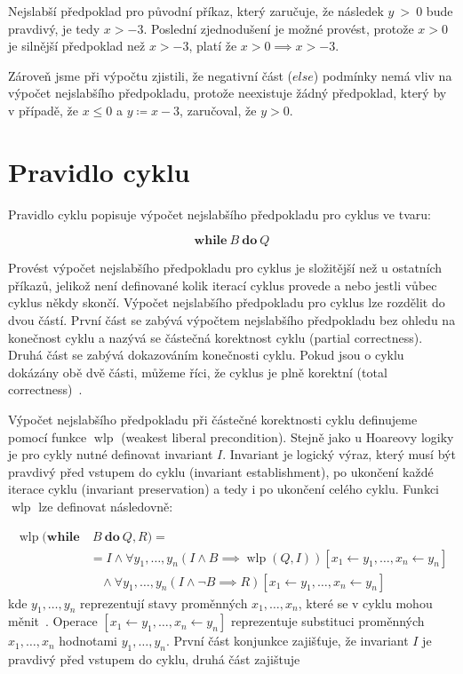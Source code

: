 Nejslabší předpoklad pro původní příkaz,
který zaručuje, že následek $y~>~0$ bude pravdivý, je tedy $x > -3$.
Poslední zjednodušení je možné provést, protože $x > 0$ je silnější předpoklad než $x > -3$,
platí že $x > 0 \implies x > -3$.

Zároveň jsme při výpočtu zjistili, že negativní část ($else$) podmínky nemá vliv na výpočet nejslabšího předpokladu,
protože neexistuje žádný předpoklad, který by v případě, že $x \leq 0$ a $y \coloneqq x - 3$, zaručoval, že $y > 0$.

\section{Pravidlo cyklu}
\label{sec:pravidlo-cyklu}

Pravidlo cyklu popisuje výpočet nejslabšího předpokladu pro cyklus ve tvaru:

\begin{equation*}
    \textbf{while} \ B \ \textbf{do} \ Q
\end{equation*}

Provést výpočet nejslabšího předpokladu pro cyklus je složitější než u ostatních příkazů,
jelikož není definované kolik iterací cyklus provede a nebo jestli vůbec cyklus někdy skončí.
Výpočet nejslabšího předpokladu pro cyklus lze rozdělit do dvou částí.
První část se zabývá výpočtem nejslabšího předpokladu bez ohledu na konečnost cyklu
a nazývá se částečná korektnost cyklu (partial correctness).
Druhá část se zabývá dokazováním konečnosti cyklu.
Pokud jsou o cyklu dokázány obě dvě části,
můžeme říci, že cyklus je plně korektní (total correctness)~\cite{arusoaie2024wp}.

Výpočet nejslabšího předpokladu při částečné korektnosti cyklu
definujeme pomocí funkce $\operatorname{wlp}$ (weakest liberal precondition).
Stejně jako u Hoareovy logiky je pro cykly nutné definovat invariant $I$.
Invariant je logický výraz, který musí být pravdivý před vstupem do cyklu (invariant establishment),
po ukončení každé iterace cyklu (invariant preservation) a tedy i po ukončení celého cyklu.
Funkci $\operatorname{wlp}$ lze definovat následovně:

\begin{align*}
    \operatorname{wlp}(\textbf{while} & \ B \ \textbf{do} \ Q, R) = \\
        & = I \land \forall y_1,\ldots,y_n \left( I \land B \implies \operatorname{wlp}(Q, I) \right)[x_1 \leftarrow y_1, \ldots, x_n \leftarrow y_n] \\
        & \ \ \ \  \land \forall y_1,\ldots,y_n \left( I \land \neg B \implies R \right)[x_1 \leftarrow y_1, \ldots, x_n \leftarrow y_n]
\end{align*}
kde $y_1, \ldots, y_n$ reprezentují stavy proměnných $x_1, \ldots, x_n$, které se v cyklu mohou měnit~\cite{arusoaie2024wp}.
Operace $[x_1 \leftarrow y_1, \ldots, x_n \leftarrow y_n]$ reprezentuje substituci proměnných $x_1, \ldots, x_n$ hodnotami $y_1, \ldots, y_n$.
První část konjunkce zajišťuje, že invariant $I$ je pravdivý před vstupem do cyklu,
druhá část zajištuje

